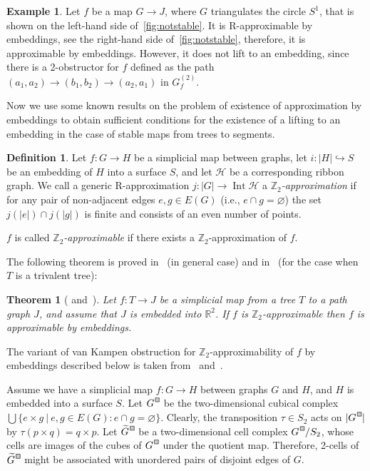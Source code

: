 \documentclass[a4paper,12pt,reqno,oneside]{amsart}
\theoremstyle{plain}
\newtheorem{theorem}{Theorem}
\theoremstyle{definition}
\newtheorem*{definition}{Definition}
\newtheorem{example}{Example}
\theoremstyle{plain}
\newcommand{\from}{\colon}
\newcommand{\wt}[1]{\widetilde{#1}}
\newcommand{\R}{\mathbb{R}}
\newcommand{\Z}{\mathbb{Z}}
\newcommand{\HH}{\mathcal{H}}
\newcommand{\gbox}{\tikz{\node[shape=rectangle,fill=black!20,draw,inner sep=0.7mm,align=center] (char) {};}}
\newcommand*\Gc{G^{\hspace{1pt}\raisebox{0.8pt}{\gbox}}}
\newcommand*\wGc{\wt{G}^{\hspace{1pt}\raisebox{0.8pt}{\gbox}}}
\DeclareMathOperator{\Int}{Int}
\begin{document}
\begin{example}
  Let $f$ be a map $G \to J$, where $G$ triangulates the circle $S^1$, that is shown on the
  left-hand side of~\cref{fig:notstable}. It is R-approximable by embeddings, see the right-hand
  side of~\cref{fig:notstable}, therefore, it is approximable by embeddings. However, it does not
  lift to an embedding, since there is a 2-obstructor for $f$ defined as the path
  $(a_1, a_2) \to (b_1, b_2) \to (a_2, a_1)$ in $G^{(2)}_f$.
\end{example}

Now we use some known results on the problem of existence of approximation by embeddings to
obtain sufficient conditions for the existence of a lifting to an embedding in the case of stable
maps from trees to segments.

\begin{definition}
  Let $f \from G \to H$ be a simplicial map between graphs, let $i \from |H| \hookrightarrow S$ be
  an embedding of $H$ into a surface $S$, and let $\HH$ be a corresponding ribbon graph.  We call a
  generic R-approximation $j \from |G| \to \Int \HH$ a
  \emph{$\Z_2$-approximation} if for any pair of non-adjacent edges
  $e, g \in E(G)$ (i.e., $e \cap g = \varnothing$) the set $j(|e|) \cap j(|g|)$ is finite and
  consists of an even number of points.

  $f$ is called \emph{$\Z_2$-approximable} if there exists a $\Z_2$-approximation of $f$.
\end{definition}

The following theorem is proved in~\cite{fulek} (in general case) and in~\cite{skop} (for the case when $T$ is a
trivalent tree):
\begin{theorem}[{\cite[Corollary 3]{fulek} and~\cite[Theorem 1.5]{skop}}]\label{thm:z2_imp_app}
  Let $f \from T \to J$ be a simplicial map from a tree $T$ to a path graph $J$, and assume that $J$ is
  embedded into $\R^2$. If $f$ is $\Z_2$-approximable then $f$ is approximable by embeddings.
\end{theorem}

The variant of van Kampen obstruction for $\Z_2$-approximability of $f$ by embeddings described
below is taken from~\cite{skop} and~\cite{repovs_skop}.

Assume we have a simplicial map $f \from G \to H$ between graphs $G$ and $H$, and $H$ is embedded
into a surface $S$. Let $\Gc$ be the two-dimensional cubical complex
$\bigcup \{ e \times g\ |\ e, g \in E(G) \colon e \cap g = \varnothing \}$. Clearly, the
transposition $\tau \in S_2$ acts on $|\Gc|$ by $\tau(p \times q) = q \times p$. Let
$\wGc$ be a two-dimensional cell complex $\Gc / S_2$, whose cells are images of the
cubes of $\Gc$ under the quotient map. Therefore, 2-cells of $\wGc$ might be associated
with unordered pairs of disjoint edges of $G$.
\end{document}
